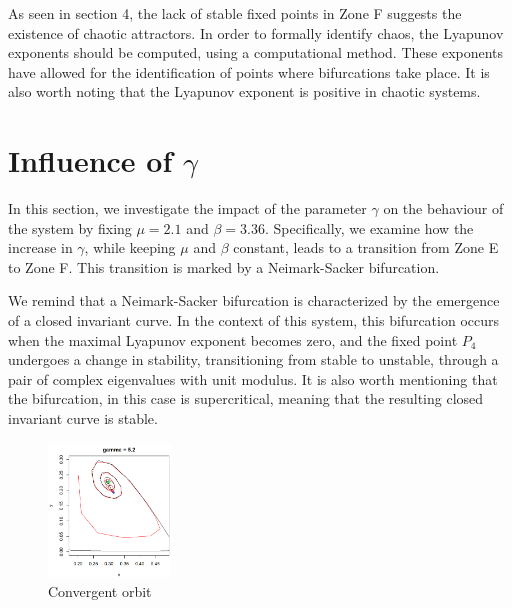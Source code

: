 \documentclass[10pt]{Configuration_Files/PoliMi3i_thesis}
\begin{document}
As seen in section 4, the lack of stable fixed points in Zone F suggests the existence of chaotic attractors.
In order to formally identify chaos, the Lyapunov exponents should be computed, using a computational method. These exponents have allowed for the identification of points where bifurcations take place. It is also worth noting that the Lyapunov exponent is positive in chaotic systems.

\section{Influence of $\gamma$}
In this section, we investigate the impact of the parameter $\gamma$ on the behaviour of the system by fixing $\mu = 2.1$ and $\beta = 3.36$. Specifically, we examine how the increase in $\gamma$, while keeping $\mu$ and $\beta$ constant, leads to a transition from Zone E to Zone F. This transition is marked by a Neimark-Sacker bifurcation.

We remind that a Neimark-Sacker bifurcation is characterized by the emergence of a closed invariant curve. In the context of this system, this bifurcation occurs when the maximal Lyapunov exponent becomes zero, and the fixed point $P_4$ undergoes a change in stability, transitioning from stable to unstable, through a pair of complex eigenvalues with unit modulus. It is also worth mentioning that the bifurcation, in this case is supercritical, meaning that the resulting closed invariant curve is stable.

\begin{figure}
\begin{center}
\includegraphics[width=0.29\textwidth]{images/Chapter 6.1/unnamed-chunk-2-1.png}
\end{center}
\caption{\footnotesize{Convergent orbit}}
\label{fig:Converging}
\end{figure}
\end{document}
